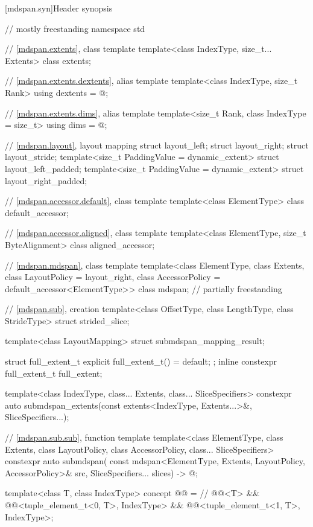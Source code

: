 [mdspan.syn]{Header  synopsis}

%
\begin{codeblock}
// mostly freestanding
namespace std {
  // \ref{mdspan.extents}, class template 
  template<class IndexType, size_t... Extents>
    class extents;

  // \ref{mdspan.extents.dextents}, alias template 
  template<class IndexType, size_t Rank>
    using dextents = @\seebelow@;

  // \ref{mdspan.extents.dims}, alias template 
  template<size_t Rank, class IndexType = size_t>
    using dims = @\seebelow@;

  // \ref{mdspan.layout}, layout mapping
  struct layout_left;
  struct layout_right;
  struct layout_stride;
  template<size_t PaddingValue = dynamic_extent>
    struct layout_left_padded;
  template<size_t PaddingValue = dynamic_extent>
    struct layout_right_padded;

  // \ref{mdspan.accessor.default}, class template 
  template<class ElementType>
    class default_accessor;

  // \ref{mdspan.accessor.aligned}, class template 
  template<class ElementType, size_t ByteAlignment>
    class aligned_accessor;

  // \ref{mdspan.mdspan}, class template 
  template<class ElementType, class Extents, class LayoutPolicy = layout_right,
           class AccessorPolicy = default_accessor<ElementType>>
    class mdspan;                                                           // partially freestanding

  // \ref{mdspan.sub},  creation
  template<class OffsetType, class LengthType, class StrideType>
    struct strided_slice;

  template<class LayoutMapping>
    struct submdspan_mapping_result;

  struct full_extent_t { explicit full_extent_t() = default; };
  inline constexpr full_extent_t full_extent{};

  template<class IndexType, class... Extents, class... SliceSpecifiers>
    constexpr auto submdspan_extents(const extents<IndexType, Extents...>&, SliceSpecifiers...);

  // \ref{mdspan.sub.sub},  function template
  template<class ElementType, class Extents, class LayoutPolicy,
           class AccessorPolicy, class... SliceSpecifiers>
    constexpr auto submdspan(
      const mdspan<ElementType, Extents, LayoutPolicy, AccessorPolicy>& src,
      SliceSpecifiers... slices) -> @\seebelow@;

  template<class T, class IndexType>
    concept @@ =               // \expos
      @@<T> &&
      @@<tuple_element_t<0, T>, IndexType> &&
      @@<tuple_element_t<1, T>, IndexType>;
}
\end{codeblock}

